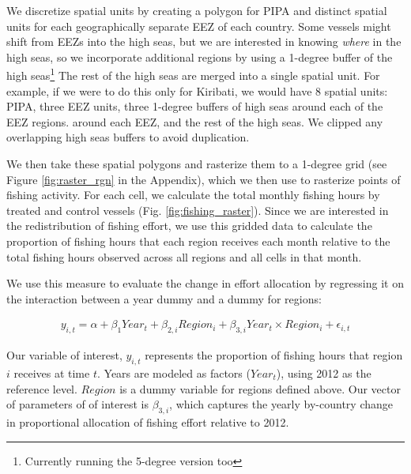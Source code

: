 \documentclass[9pttwoside,lineno]{pnas-new}
\begin{document}
We discretize spatial units by creating a polygon for
PIPA and distinct
spatial units for each geographically separate EEZ of each country. Some vessels might shift
from EEZs into the high seas, but we are interested in knowing
\emph{where} in the high seas, so we incorporate additional regions by
using a 1-degree buffer of the high seas\footnote{Currently running the 5-degree version too}
The rest of the high seas are merged into a single spatial unit. For
example, if we were to do this only for Kiribati, we would have 8
spatial units: PIPA, three EEZ units, three 1-degree buffers of high seas  around each of the EEZ regions.
around each EEZ, and the rest of the high seas. We clipped any overlapping
high seas buffers to avoid duplication.

We then take these spatial polygons and rasterize them to a 1-degree grid
(see Figure \ref{fig:raster_rgn} in the Appendix), which we then use to rasterize points
of fishing activity. For each cell, we calculate the total monthly
fishing hours by treated and control vessels (Fig. \ref{fig:fishing_raster}).
Since we are interested in the redistribution
of fishing effort, we use this gridded data to calculate the proportion
of fishing hours that each region receives each month relative to the
total fishing hours observed across all regions and all cells in that
month.

We use this measure to evaluate the change in effort allocation by
regressing it on the interaction between a year dummy and a dummy for
regions:

\begin{figure}[h]
\begin{align*}
y_{i,t} = \alpha + \beta_1Year_t + \beta_{2,i}Region_i + \beta_{3,i}Year_t \times Region_i+ \epsilon_{i,t}
\end{align*}
\end{figure}


Our variable of interest, $y_{i,t}$ represents the proportion of
fishing hours that region $i$ receives at time $t$. Years are
modeled as factors ($Year_t$), using 2012 as the reference level.
$Region$ is a dummy variable for regions defined above. Our vector of parameters of
of interest is $\beta_{3,i}$, which captures the yearly by-country
change in proportional allocation of fishing effort relative to 2012.
\end{document}
